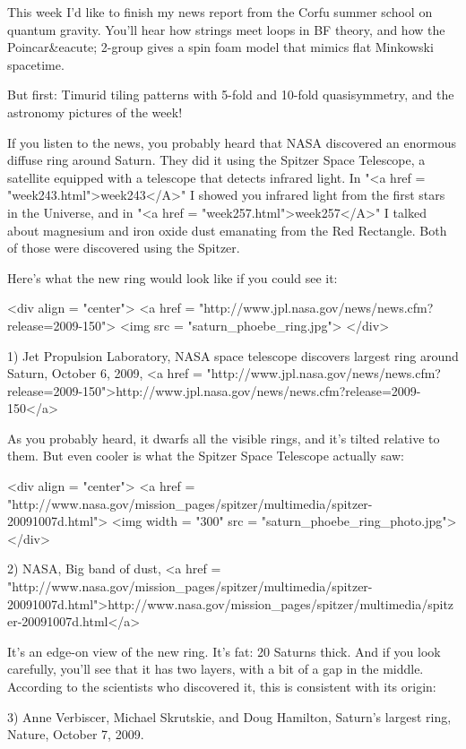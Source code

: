 


This week I'd like to finish my news report from the Corfu
summer school on quantum gravity.
You'll hear how strings meet loops in BF theory, 
and how the Poincar&eacute; 2-group gives a spin foam model that mimics flat
Minkowski spacetime.  

But first: Timurid tiling patterns with 5-fold and 10-fold
quasisymmetry, and the astronomy pictures of the week!

If you listen to the news, you probably heard that NASA discovered an
enormous diffuse ring around Saturn.  They did it using the Spitzer
Space Telescope, a satellite equipped with a telescope that detects
infrared light.  In "<a href = "week243.html">week243</A>" I
showed you infrared light from the first stars in the Universe, and in
"<a href = "week257.html">week257</A>" I talked about
magnesium and iron oxide dust emanating from the Red Rectangle.  Both
of those were discovered using the Spitzer.

Here's what the new ring would look like if you could see it:

<div align = "center">
<a href = "http://www.jpl.nasa.gov/news/news.cfm?release=2009-150">
<img src = "saturn_phoebe_ring.jpg">
</div>

1) Jet Propulsion Laboratory,
NASA space telescope discovers largest ring around Saturn, October 6,
2009, <a href = "http://www.jpl.nasa.gov/news/news.cfm?release=2009-150">http://www.jpl.nasa.gov/news/news.cfm?release=2009-150</a>

As you probably heard, it dwarfs all the visible rings, and it's
tilted relative to them.  But even cooler is what the Spitzer Space
Telescope actually saw:

<div align = "center">
<a href = "http://www.nasa.gov/mission_pages/spitzer/multimedia/spitzer-20091007d.html">
<img width = "300" src = "saturn_phoebe_ring_photo.jpg">
</div>

2) NASA, Big band of dust,
<a href = "http://www.nasa.gov/mission_pages/spitzer/multimedia/spitzer-20091007d.html">http://www.nasa.gov/mission_pages/spitzer/multimedia/spitzer-20091007d.html</a>

It's an edge-on view of the new ring.  It's fat: 20 Saturns thick.
And if you look carefully, you'll see that it has two layers, with a
bit of a gap in the middle.  According to the scientists who
discovered it, this is consistent with its origin:

3) Anne Verbiscer, Michael Skrutskie, and Doug Hamilton, Saturn's largest ring, Nature, October 7, 2009.

